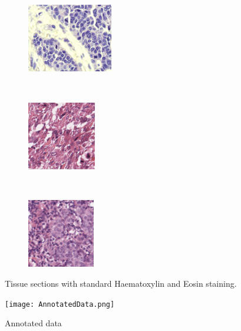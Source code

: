 \documentclass[a4paper,10pt,twocolumn]{article}
\begin{document}
\begin{figure}[!ht]
\centering
\begin{subfigure}{.3\textwidth}
  \centering
  \includegraphics[height=3cm]{histo1.png}
  \caption{}
  \label{fig:sub1}
\end{subfigure}%
~
\begin{subfigure}{.3\textwidth}
  \centering
  \includegraphics[height=3cm]{histo2.png}
  \caption{}
  \label{fig:sub2}
\end{subfigure}
~
\begin{subfigure}{.3\textwidth}
  \centering
  \includegraphics[height=3cm]{histo3.png}
  \caption{}
  \label{fig:sub3}
\end{subfigure}
\caption{Tissue sections with standard Haematoxylin and Eosin staining.}
\label{fig:example_histopath}
\end{figure}

\begin{figure}[!ht]
\centering
\texttt{[image: AnnotatedData.png]}
\caption{Annotated data}
\label{fig:AnnotatedData}
\end{figure}
\end{document}
